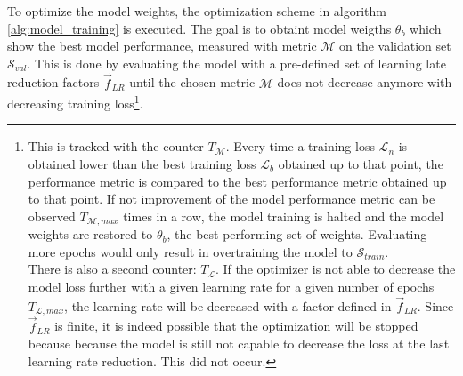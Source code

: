 To optimize the model weights, the optimization scheme in algorithm \ref{alg:model_training} is executed.
The goal is to obtaint model weigths $\theta_b$ which show the best model performance, measured with metric $\mathcal{M}$ on the validation set $\mathcal{S}_{val}$.
This is done by evaluating the model with a pre-defined set of learning late reduction factors $\vec{f}_{LR}$ until the chosen metric $\mathcal{M}$ does not decrease anymore with decreasing training loss\footnote{
    This is tracked with the counter $T_\mathcal{M}$. Every time a training loss $\mathcal{L}_n$ is obtained lower than the best training loss $\mathcal{L}_b$ obtained up to that point, 
    the performance metric is compared to the best performance metric obtained up to that point. 
    If not improvement of the model performance metric can be observed $T_{\mathcal{M}, max}$ times in a row, the model training is halted and the model weights are restored to $\theta_b$, the best performing set of weights.
    Evaluating more epochs would only result in overtraining the model to $\mathcal{S}_{train}$.
    \\[5pt]
    There is also a second counter: $T_\mathcal{L}$. If the optimizer is not able to decrease the model loss further with a given learning rate for a given number of epochs $T_{\mathcal{L}, max}$, the learning rate will be decreased with a factor defined in $\vec{f}_{LR}$.
    Since $\vec{f}_{LR}$ is finite, it is indeed possible that the optimization will be stopped because because the model is still not capable to decrease the loss at the last learning rate reduction.
    This did not occur.
}.

